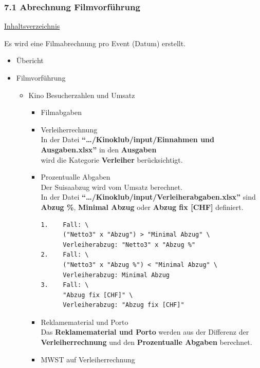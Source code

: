 \documentclass[
]{article}
\providecommand{\tightlist}{%
  \setlength{\itemsep}{0pt}\setlength{\parskip}{0pt}}
\begin{document}
\subsubsection{7.1 Abrechnung
Filmvorführung}\label{abrechnung-filmvorfuxfchrung}

\hyperref[Inhaltsverzeichnis]{Inhaltsverzeichnis}

Es wird eine Filmabrechnung pro Event (Datum) erstellt.

\begin{itemize}
\tightlist
\item
  Übericht
\item
  Filmvorführung

  \begin{itemize}
  \tightlist
  \item
    Kino Besucherzahlen und Umsatz

    \begin{itemize}
    \item
      Filmabgaben
    \item
      Verleiherrechnung\\
      In der Datei \textbf{``\ldots/Kinoklub/input/Einnahmen und
      Ausgaben.xlsx''} in den \textbf{Ausgaben}\\
      wird die Kategorie \textbf{Verleiher} berücksichtigt.
    \item
      Prozentualle Abgaben\\
      Der Suisaabzug wird vom Umsatz berechnet.\\
      In der Datei
      \textbf{``\ldots/Kinoklub/input/Verleiherabgaben.xlsx''} sind
      \textbf{Abzug \%}, \textbf{Minimal Abzug} oder \textbf{Abzug fix
      {[}CHF{]}} definiert.\\

\begin{verbatim}
1.    Fall: \
      ("Netto3" x "Abzug") > "Minimal Abzug" \
      Verleiherabzug: "Netto3" x "Abzug %"
2.    Fall: \
      ("Netto3" x "Abzug %") < "Minimal Abzug" \
      Verleiherabzug: Minimal Abzug
3.    Fall: \
      "Abzug fix [CHF]" \
      Verleiherabzug: "Abzug fix [CHF]"
\end{verbatim}
    \item
      Reklamematerial und Porto\\
      Das \textbf{Reklamematerial und Porto} werden aus der Differenz
      der \textbf{Verleiherrechnung} und den \textbf{Prozentualle
      Abgaben} berechnet.
    \item
      MWST auf Verleiherrechnung\\


\end{itemize}
\end{itemize}
\end{itemize}
\end{document}
